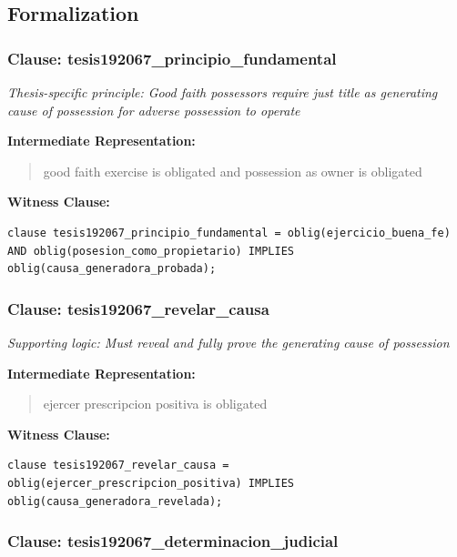\documentclass[11pt,a4paper]{article}
\begin{document}
\subsection{Formalization}

\subsubsection{Clause: tesis192067\_principio\_fundamental}

\textit{Thesis-specific principle: Good faith possessors require just title as generating cause of possession for adverse possession to operate}

\textbf{Intermediate Representation:}

\begin{quote}
good faith exercise is obligated and possession as owner is obligated
\end{quote}

\textbf{Witness Clause:}

\begin{lstlisting}[style=witnessstyle, language=Witness]
clause tesis192067_principio_fundamental = oblig(ejercicio_buena_fe) AND oblig(posesion_como_propietario) IMPLIES oblig(causa_generadora_probada);
\end{lstlisting}

\subsubsection{Clause: tesis192067\_revelar\_causa}

\textit{Supporting logic: Must reveal and fully prove the generating cause of possession}

\textbf{Intermediate Representation:}

\begin{quote}
ejercer prescripcion positiva is obligated
\end{quote}

\textbf{Witness Clause:}

\begin{lstlisting}[style=witnessstyle, language=Witness]
clause tesis192067_revelar_causa = oblig(ejercer_prescripcion_positiva) IMPLIES oblig(causa_generadora_revelada);
\end{lstlisting}

\subsubsection{Clause: tesis192067\_determinacion\_judicial}
\end{document}
